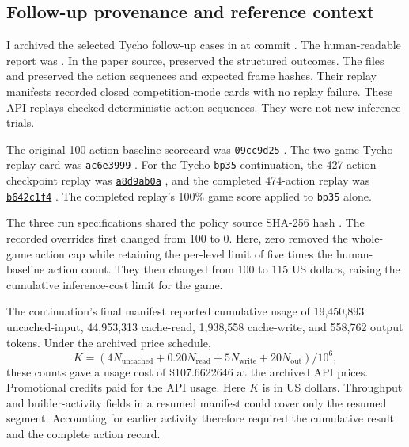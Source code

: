 \subsection{Follow-up provenance and reference context}\label{app:followup}
I archived the selected Tycho follow-up cases in  at commit . The human-readable report was . In the paper source,  preserved the structured outcomes. The files  and  preserved the action sequences and expected frame hashes. Their replay manifests recorded closed competition-mode cards with no replay failure. These API replays checked deterministic action sequences. They were not new inference trials.

The original 100-action baseline scorecard was \href{https://arcprize.org/scorecards/09cc9d25-ec26-4f26-98f8-9cbd60ec69d7}{\texttt{09cc9d25}} \citep{scorecard2026reported}. The two-game Tycho replay card was \href{https://arcprize.org/scorecards/ac6e3999-e5e4-4488-b981-9d6d80eff73f}{\texttt{ac6e3999}} \citep{scorecard2026tychocard}. For the Tycho \texttt{bp35} continuation, the 427-action checkpoint replay was \href{https://arcprize.org/replay/a8d9ab0a-653c-4e47-8f29-d932551cdd4d}{\texttt{a8d9ab0a}} \citep{scorecard2026bp35checkpoint}, and the completed 474-action replay was \href{https://arcprize.org/replay/b642c1f4-99b6-491f-8e84-813ca4634314}{\texttt{b642c1f4}} \citep{scorecard2026bp35win}. The completed replay's 100\% game score applied to \texttt{bp35} alone.

The three run specifications shared the policy source SHA-256 hash . The recorded overrides first changed  from 100 to 0. Here, zero removed the whole-game action cap while retaining the per-level limit of five times the human-baseline action count. They then changed  from 100 to 115 US dollars, raising the cumulative inference-cost limit for the game.

The continuation's final manifest reported cumulative usage of 19,450,893 uncached-input, 44,953,313 cache-read, 1,938,558 cache-write, and 558,762 output tokens. Under the archived price schedule,
\[
K=(4N_{\mathrm{uncached}}+0.20N_{\mathrm{read}}+5N_{\mathrm{write}}+20N_{\mathrm{out}})/10^6,
\]
these counts gave a usage cost of \$107.6622646 at the archived API prices. Promotional credits paid for the API usage. Here $K$ is in US dollars. Throughput and builder-activity fields in a resumed manifest could cover only the resumed segment. Accounting for earlier activity therefore required the cumulative result and the complete action record.

